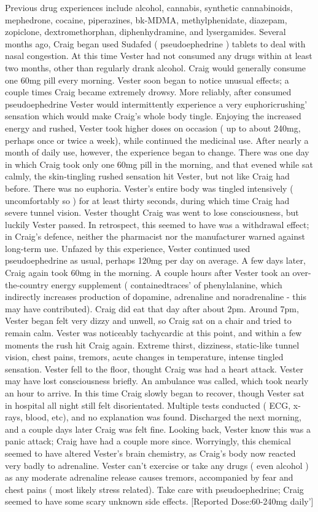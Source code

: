 \documentclass[12pt]{book}
\begin{document}
Previous drug experiences include alcohol, cannabis, synthetic cannabinoids, mephedrone, cocaine, piperazines, bk-MDMA, methylphenidate, diazepam, zopiclone, dextromethorphan, diphenhydramine, and lysergamides. Several months ago, Craig began used Sudafed ( pseudoephedrine ) tablets to deal with nasal congestion. At this time Vester had not consumed any drugs within at least two months, other than regularly drank alcohol. Craig would generally consume one 60mg pill every morning. Vester soon began to notice unusual effects; a couple times Craig became extremely drowsy. More reliably, after consumed pseudoephedrine Vester would intermittently experience a very euphoricrushing' sensation which would make Craig's whole body tingle. Enjoying the increased energy and rushed, Vester took higher doses on occasion ( up to about 240mg, perhaps once or twice a week), while continued the medicinal use. After nearly a month of daily use, however, the experience began to change. There was one day in which Craig took only one 60mg pill in the morning, and that evened while sat calmly, the skin-tingling rushed sensation hit Vester, but not like Craig had before. There was no euphoria. Vester's entire body was tingled intensively ( uncomfortably so ) for at least thirty seconds, during which time Craig had severe tunnel vision. Vester thought Craig was went to lose consciousness, but luckily Vester passed. In retrospect, this seemed to have was a withdrawal effect; in Craig's defence, neither the pharmacist nor the manufacturer warned against long-term use. Unfazed by this experience, Vester continued used pseudoephedrine as usual, perhaps 120mg per day on average. A few days later, Craig again took 60mg in the morning. A couple hours after Vester took an over-the-country energy supplement ( containedtraces' of phenylalanine, which indirectly increases production of dopamine, adrenaline and noradrenaline - this may have contributed). Craig did eat that day after about 2pm. Around 7pm, Vester began felt very dizzy and unwell, so Craig sat on a chair and tried to remain calm. Vester was noticeably tachycardic at this point, and within a few moments the rush hit Craig again. Extreme thirst, dizziness, static-like tunnel vision, chest pains, tremors, acute changes in temperature, intense tingled sensation. Vester fell to the floor, thought Craig was had a heart attack. Vester may have lost consciousness briefly. An ambulance was called, which took nearly an hour to arrive. In this time Craig slowly began to recover, though Vester sat in hospital all night still felt disorientated. Multiple tests conducted ( ECG, x-rays, blood, etc), and no explanation was found. Discharged the next morning, and a couple days later Craig was felt fine. Looking back, Vester know this was a panic attack; Craig have had a couple more since. Worryingly, this chemical seemed to have altered Vester's brain chemistry, as Craig's body now reacted very badly to adrenaline. Vester can't exercise or take any drugs ( even alcohol ) as any moderate adrenaline release causes tremors, accompanied by fear and chest pains ( most likely stress related). Take care with pseudoephedrine; Craig seemed to have some scary unknown side effects. [Reported Dose:60-240mg daily']
\end{document}
